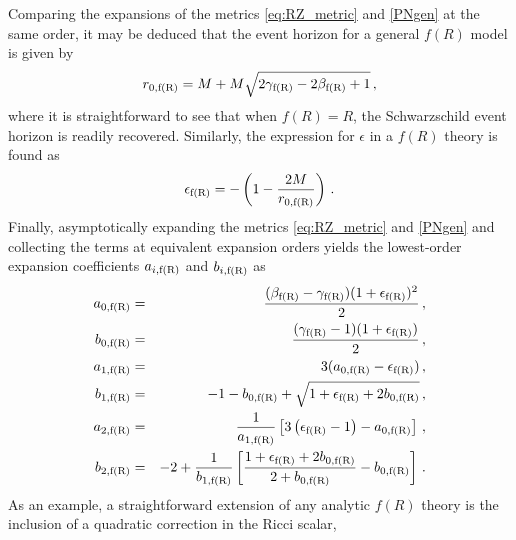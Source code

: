\documentclass[a4paper,aps,twocolumn,showpacs,showkeys,nofootinbib,preprintnumbers,superscriptaddress,amsmath,amssymb,amsfonts]{revtex4-1}
\begin{document}
Comparing the expansions of the metrics \eqref{eq:RZ_metric} and
\eqref{PNgen} at the same order, it may be deduced that the event horizon for
a general $f(R)$ model is given by
%
\begin{equation}
r_{0,{{\rm f(R)}}} = M+M\sqrt{2 \gamma_{\rm f(R)}-2\beta_{\rm f(R)}+1} \,,
\end{equation}
%
where it is straightforward to see that when $f(R)=R$, the Schwarzschild
event horizon is readily recovered. Similarly, the
expression for $\epsilon$ in a $f(R)$ theory is found as
%
\begin{equation}
\epsilon_{\rm f(R)} = -\left(1 - \frac{2M}{r_{0,{{\rm f(R)}}}} \right) \,.
\end{equation}
%
Finally, asymptotically expanding the metrics \eqref{eq:RZ_metric} and 
\eqref{PNgen} and collecting the terms at equivalent expansion orders
yields the lowest-order expansion coefficients $a_{i,{{\rm f(R)}}}$ and
$b_{i,{{\rm f(R)}}}$ as
%
\begin{eqnarray}\label{a0fR}
a_{0,{{\rm f(R)}}} &=& \frac{(\beta_{\rm f(R)}-\gamma_{\rm f(R)})
                                                 (1+\epsilon_{\rm f(R)})^2}{2} \,, \\
b_{0,{{\rm f(R)}}} &=& \frac{(\gamma_{\rm f(R)}-1)
                                                 (1+\epsilon_{\rm f(R)})}{2} \,, \\
a_{1,{{\rm f(R)}}} &=& 3(a_{0,{\rm f(R)}}-\epsilon_{\rm f(R)})\,, \\
b_{1,{{\rm f(R)}}} &=& - 1 - b_{0,{\rm f(R)}} + 
                                                    \sqrt{1+\epsilon_{\rm f(R)}
                                                  + 2b_{0,{\rm f(R)}}}\,, \\
a_{2,{{\rm f(R)}}} &=& \frac{1}{a_{1,{\rm f(R)}}}
                                                  \left[3\left(\epsilon_{\rm f(R)}-1\right) - 
                                                  a_{0,{\rm f(R)}}\right]\,, \\
b_{2,{{\rm f(R)}}} &=& - 2+\frac{1}{b_{1,{\rm f(R)}}}
                                                    \left[\frac{1+\epsilon_{\rm f(R)} + 
                                                    2b_{0,{\rm f(R)}}}{2+b_{0,{\rm f(R)}}} - 
                                                    b_{0,{\rm f(R)}}\right] \,. \nonumber \\
\end{eqnarray}
%
As an example, a straightforward extension of any analytic $f(R)$
theory is the inclusion of a quadratic 
correction in the Ricci scalar,
\end{document}
